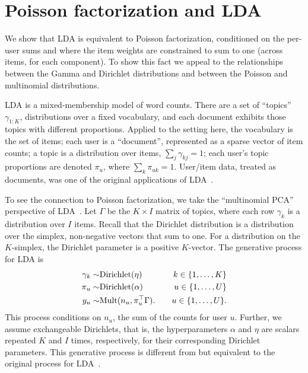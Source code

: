 \documentclass{sig-alternate}
\begin{document}







\appendix

\section{Poisson factorization and LDA}

We show that LDA is equivalent to Poisson factorization, conditioned
on the per-user sums and where the item weights are constrained to sum
to one (across items, for each component).  To show this fact we
appeal to the relationships between the Gamma and Dirichlet
distributions and between the Poisson and multinomial distributions.

LDA is a mixed-membership model of word counts.  There are a set of
``topics'' $\gamma_{1:K}$, distributions over a fixed vocabulary, and
each document exhibits those topics with different proportions.
Applied to the setting here, the vocabulary is the set of items; each
user is a ``document'', represented as a sparse vector of item counts;
a topic is a distribution over items, $\sum_{j} \gamma_{kj} = 1$; each
user's topic proportions are denoted $\pi_u$, where $\sum_k \pi_{uk} =
1$.  User/item data, treated as documents, was one of the original
applications of LDA~\cite{Blei:2003b}.

To see the connection to Poisson factorization, we take the
``multinomial PCA'' perspective of LDA~\cite{Buntine:2004}.  Let
$\Gamma$ be the $K \times I$ matrix of topics, where each row
$\gamma_k$ is a distribution over $I$ items.  Recall that the
Dirichlet distribution is a distribution over the simplex,
non-negative vectors that sum to one.  For a distribution on the
$K$-simplex, the Dirichlet parameter is a positive $K$-vector.  The
generative process for LDA is
\begin{eqnarray*}
  \gamma_k \sim & \textrm{Dirichlet}(\eta) & \quad k \in \{1, \ldots,
  K\} \\
  \pi_u  \sim &\textrm{Dirichlet}(\alpha) & \quad u \in \{1, \ldots, U\}
  \\
  y_u \sim & \textrm{Mult}(n_u, \pi_u^\top \Gamma). & \quad u \in
  \{1, \ldots, U\}.
\end{eqnarray*}
This process conditions on $n_u$, the sum of the counts for user $u$.
Further, we assume exchangeable Dirichlets, that is, the
hyperparameters $\alpha$ and $\eta$ are scalars repeated $K$ and $I$
times, respectively, for their corresponding Dirichlet parameters.
This generative process is different from but equivalent to the
original process for LDA~\cite{Blei:2003b}.
\end{document}
